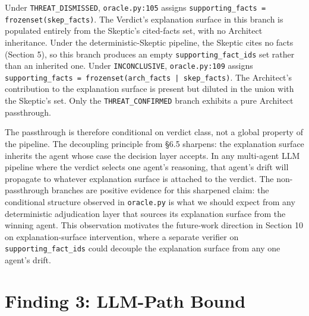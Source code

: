 \documentclass[sigconf,anonymous,review,nonacm=false]{acmart}
\begin{document}
Under \texttt{THREAT\_DISMISSED}, \texttt{oracle.py:105} assigns \texttt{supporting\_facts = frozenset(skep\_facts)}. The Verdict's explanation surface in this branch is populated entirely from the Skeptic's cited-facts set, with no Architect inheritance. Under the deterministic-Skeptic pipeline, the Skeptic cites no facts (Section 5), so this branch produces an empty \texttt{supporting\_fact\_ids} set rather than an inherited one. Under \texttt{INCONCLUSIVE}, \texttt{oracle.py:109} assigns \texttt{supporting\_facts = frozenset(arch\_facts | skep\_facts)}. The Architect's contribution to the explanation surface is present but diluted in the union with the Skeptic's set. Only the \texttt{THREAT\_CONFIRMED} branch exhibits a pure Architect passthrough.

The passthrough is therefore conditional on verdict class, not a global property of the pipeline. The decoupling principle from §6.5 sharpens: the explanation surface inherits the agent whose case the decision layer accepts. In any multi-agent LLM pipeline where the verdict selects one agent's reasoning, that agent's drift will propagate to whatever explanation surface is attached to the verdict. The non-passthrough branches are positive evidence for this sharpened claim: the conditional structure observed in \texttt{oracle.py} is what we should expect from any deterministic adjudication layer that sources its explanation surface from the winning agent. This observation motivates the future-work direction in Section 10 on explanation-surface intervention, where a separate verifier on \texttt{supporting\_fact\_ids} could decouple the explanation surface from any one agent's drift.


\section{Finding 3: LLM-Path Bound}
\end{document}

